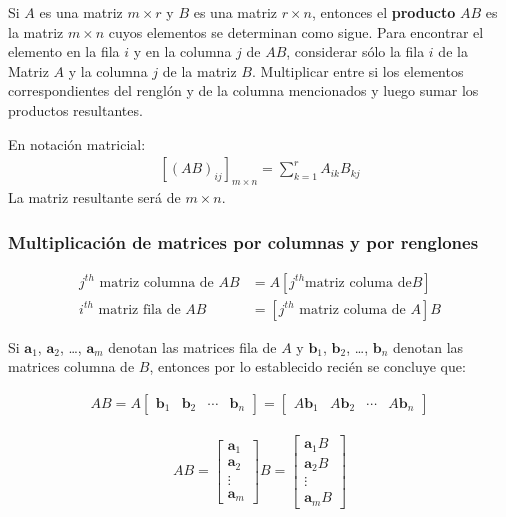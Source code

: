 \documentclass[a4paper,12pt]{article}
\begin{document}
\begin{concept}
  Si $A$ es una matriz $m\times r$ y $B$ es una matriz $r\times n$, entonces
  el \textbf{producto} $AB$ es la matriz $m\times n$ cuyos elementos se
  determinan como sigue. Para encontrar el elemento en la fila $i$ y en la
  columna $j$ de $AB$, considerar sólo la fila $i$ de la Matriz $A$ y la
  columna $j$ de la matriz $B$. Multiplicar entre si los elementos
  correspondientes del renglón y de la columna mencionados y luego sumar los
  productos resultantes.
\end{concept}
En notación matricial:
\begin{align*}
  \left[ (AB)_{ij} \right]_{m\times n} = \sum_{k=1}^r A_{ik}B_{kj}
\end{align*}
La matriz resultante será de $m\times n$.

\subsubsection{Multiplicación de matrices por columnas y por renglones}

\begin{align*}
  j^{th} \textrm{ matriz columna de } AB &= A \left[ j^{th} \textrm{matriz columa de} B
  \right] \\
  i^{th}\textrm{ matriz fila de } AB &= \left[ j^{th} \textrm{ matriz columa de } A
  \right] B
\end{align*}

Si $\textbf{a}_1$, $\textbf{a}_2$, \ldots, $\textbf{a}_m$ denotan las matrices
fila de $A$ y $\textbf{b}_1$, $\textbf{b}_2$, \ldots, $\textbf{b}_n$ denotan
las matrices columna de $B$, entonces por lo establecido recién se concluye
que:

\begin{align*}
  AB =
  A\begin{bmatrix}\textbf{b}_1&\textbf{b}_2&\cdots&\textbf{b}_n \end{bmatrix}
    =
    \begin{bmatrix}A\textbf{b}_1&A\textbf{b}_2&\cdots&A\textbf{b}_n\end{bmatrix}
\end{align*}

\begin{align*}
  AB = \begin{bmatrix}
    \textbf{a}_1 \\
    \textbf{a}_2 \\
    \vdots       \\
    \textbf{a}_m
  \end{bmatrix} B = \begin{bmatrix}
    \textbf{a}_1B \\
    \textbf{a}_2B \\
    \vdots        \\
    \textbf{a}_mB
  \end{bmatrix}
\end{align*}
\end{document}
